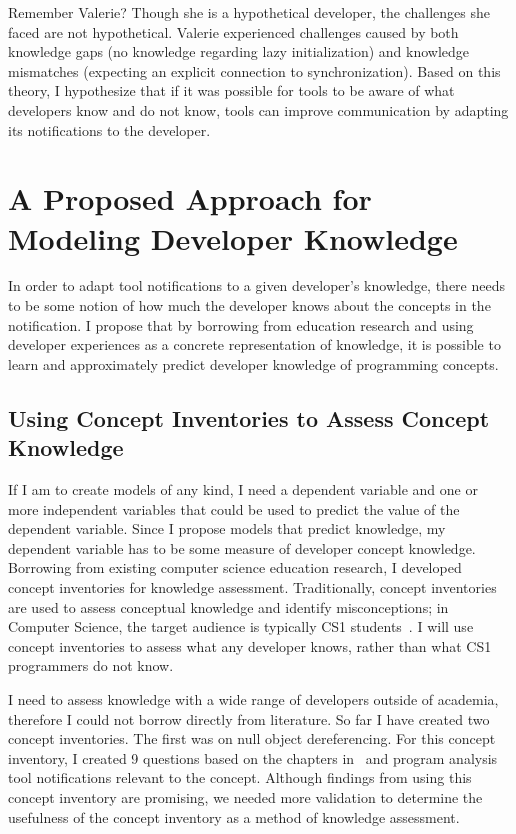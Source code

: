 \documentclass{llncs}
\begin{document}
Remember Valerie? Though she is a hypothetical developer, the challenges she faced are not hypothetical. Valerie experienced challenges caused by both knowledge gaps (no knowledge regarding lazy initialization) and knowledge mismatches (expecting an explicit connection to synchronization). Based on this theory, I hypothesize that if it was possible for tools to be aware of what developers know and do not know, tools can improve communication by adapting its notifications to the developer.

\section{A Proposed Approach for Modeling Developer Knowledge}
In order to adapt tool notifications to a given developer's knowledge, there needs to be some notion of how much the developer knows about the concepts in the notification. I propose that by borrowing from education research and using developer experiences as a concrete representation of knowledge, it is possible to learn and approximately predict developer knowledge of programming concepts.

\subsection{Using Concept Inventories to Assess Concept Knowledge}
If I am to create models of any kind, I need a dependent variable and one or more independent variables that could be used to predict the value of the dependent variable. Since I propose models that predict knowledge, my dependent variable has to be some measure of developer concept knowledge.
Borrowing from existing computer science education research, I developed concept inventories for knowledge assessment. Traditionally, concept inventories are used to  assess conceptual knowledge and identify misconceptions; in Computer Science, the target audience is typically CS1 students~\cite{tew2010developing,kaczmarczyk2010identifying}. I will use concept inventories to assess what any developer knows, rather than what CS1 programmers do not know.

I need to assess knowledge with a wide range of developers outside of academia, therefore I could not borrow directly from literature. So far I have created two concept inventories. The first was on null object dereferencing. For this concept inventory, I created 9 questions based on the chapters in~\cite{stuart2011building} and program analysis tool notifications relevant to the concept. Although findings from using this concept inventory are promising, we needed more validation to determine the usefulness of the concept inventory as a method of knowledge assessment. 
\end{document}

